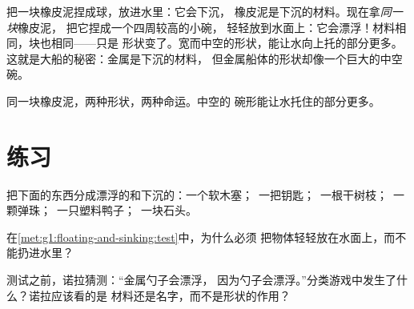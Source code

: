 \begin{example}[橡皮泥小船]\label{ex:g1:floating-and-sinking:boat}
把一块橡皮泥捏成球，放进水里：它会下沉，
橡皮泥是下沉的材料。现在拿\emph{同一块}橡皮泥，
把它捏成一个四周较高的小碗，
轻轻放到水面上：它会漂浮！材料相同，块也相同——只是
形状变了。宽而中空的形状，能让水向上托的部分更多。
这就是大船的秘密：金属是下沉的材料，
但金属船体的形状却像一个巨大的中空碗。
\end{example}

\begin{omfigure}

{\small 同一块橡皮泥，两种形状，两种命运。中空的
碗形能让水托住的部分更多。}
\end{omfigure}

\section{练习}

\begin{exercise}[$\star$]\label{exo:g1:floating-and-sinking:1}
把下面的东西分成漂浮的和下沉的：一个软木塞；\ 一把钥匙；\ 一根干树枝；\ 一
颗弹珠；\ 一只塑料鸭子；\ 一块石头。
\end{exercise}

\begin{exercise}[$\star$]\label{exo:g1:floating-and-sinking:2}
在\cref{met:g1:floating-and-sinking:test}中，为什么必须
把物体轻轻放在水面上，而不能扔进水里？
\end{exercise}

\begin{exercise}[$\star$]\label{exo:g1:floating-and-sinking:3}
测试之前，诺拉猜测：“金属勺子会漂浮，
因为勺子会漂浮。”分类游戏中发生了什么？诺拉应该看的是
材料还是名字，而不是形状的作用？
\end{exercise}


